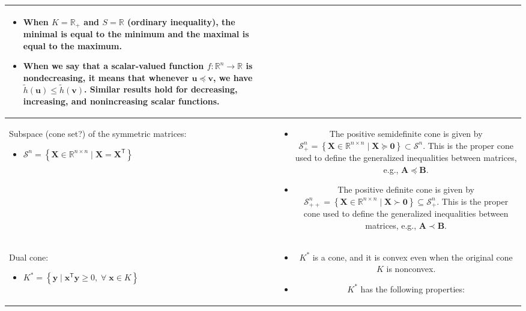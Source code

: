 \documentclass{article}
\begin{document}
\begin{table}[ht!]
\begin{tabularx}{\textwidth}{|A|C|}
\begin{itemize}[leftmargin=*]
    \item When \(K = \mathbb{R}_{+}\) and \(S = \mathbb{R}\) (ordinary inequality), the minimal is equal to the minimum and the maximal is equal to the maximum.
    \item When we say that a scalar-valued function \(f: \mathbb{R}^{n} \rightarrow \mathbb{R}\) is nondecreasing, it means that whenever \(\mathbf{u}\preceq \mathbf{v}\), we have \(\tilde{h}(\mathbf{u})\leq \tilde{h}(\mathbf{v})\). Similar results hold for decreasing, increasing, and nonincreasing scalar functions.
\end{itemize} \\
\hline
Subspace (cone set?) of the symmetric matrices:
\begin{itemize}
    \item \(\mathcal{S}^n = \left\{ \mathbf{X} \in \mathbb{R}^{n\times n} \mid \mathbf{X} = \mathbf{X}^\mathsf{T}\right\}\)
\end{itemize} & \vspace{-3.5ex} \begin{itemize}[leftmargin=*]
    \item The positive semidefinite cone is given by \(\mathcal{S}^n_+ = \left\{ \mathbf{X} \in \mathbb{R}^{n\times n} \mid \mathbf{X} \succeq \mathbf{0} \right\} \subset \mathcal{S}^n\). This is the proper cone used to define the generalized inequalities between matrices, e.g., \(\mathbf{A} \preceq \mathbf{B}\).
    \item The positive definite cone is given by \(\mathcal{S}^n_{++} = \left\{ \mathbf{X} \in \mathbb{R}^{n\times n} \mid \mathbf{X} \succ \mathbf{0} \right\}\subseteq \mathcal{S}^n_+ \). This is the proper cone used to define the generalized inequalities between matrices, e.g., \(\mathbf{A} \prec \mathbf{B}\).
\end{itemize} \\
\hline
Dual cone:
\begin{itemize}
    \item \(K^* = \left\{ \mathbf{y}\mid \mathbf{x}^\mathsf{T}\mathbf{y} \geq 0, \;\forall\; \mathbf{x} \in K \right\}\)
\end{itemize} & \vspace{-3.5ex} \begin{itemize}[leftmargin=*]
    \item \(K^*\) is a cone, and it is convex even when the original cone \(K\) is nonconvex.
    \item \(K^*\) has the following properties:
    \begin{itemize}[label={$\triangleright$}]

\end{itemize}
\end{itemize}
\end{tabularx}
\end{table}
\end{document}
